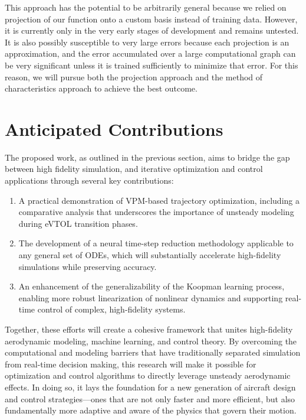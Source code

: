 \documentclass[12pt, letterpaper]{article}
\begin{document}
This approach has the potential to be arbitrarily general because we relied on projection of our function onto a custom basis instead of training data.  However, it is currently only in the very early stages of development and remains untested.  It is also possibly susceptible to very large errors because each projection is an approximation, and the error accumulated over a large computational graph can be very significant unless it is trained sufficiently to minimize that error. For this reason, we will pursue both the projection approach and the method of characteristics approach to achieve the best outcome.


\section{Anticipated Contributions}


The proposed work, as outlined in the previous section, aims to bridge the gap between high fidelity simulation, and iterative optimization and control applications through several key contributions:

\begin{enumerate}
\item A practical demonstration of VPM-based trajectory optimization, including a comparative analysis that underscores the importance of unsteady modeling during eVTOL transition phases.
\item The development of a neural time-step reduction methodology applicable to any general set of ODEs, which will substantially accelerate high-fidelity simulations while preserving accuracy.
\item An enhancement of the generalizability of the Koopman learning process, enabling more robust linearization of nonlinear dynamics and supporting real-time control of complex, high-fidelity systems.
\end{enumerate}

Together, these efforts will create a cohesive framework that unites high-fidelity aerodynamic modeling, machine learning, and control theory. By overcoming the computational and modeling barriers that have traditionally separated simulation from real-time decision making, this research will make it possible for optimization and control algorithms to directly leverage unsteady aerodynamic effects. In doing so, it lays the foundation for a new generation of aircraft design and control strategies—ones that are not only faster and more efficient, but also fundamentally more adaptive and aware of the physics that govern their motion.
\end{document}
